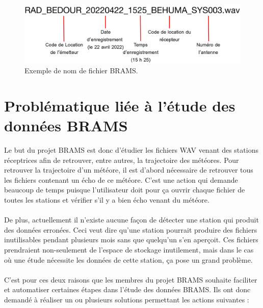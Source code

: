 \documentclass[11pt]{article}
\begin{document}
\begin{figure}[t]
    \begin{center}
        \includegraphics[scale=0.15]{file_name.png}
        \caption{Exemple de nom de fichier BRAMS.}
        \label{fig:file_name_brams}
    \end{center}
\end{figure}

\newpage

\section{Problématique liée à l'étude des données BRAMS}

Le but du projet BRAMS est donc d'étudier les fichiers WAV venant des stations réceptrices afin de retrouver, entre autres, la trajectoire des météores.
Pour retrouver la trajectoire d'un météore, il est d'abord nécessaire de retrouver tous les fichiers contenant un écho de ce météore.
C'est une action qui demande beaucoup de temps puisque l'utilisateur doit pour ça ouvrir chaque fichier de toutes les stations et vérifier s'il y a bien écho venant du météore.\\
\\
De plus, actuellement il n'existe aucune façon de détecter une station qui produit des données erronées.
Ceci veut dire qu'une station pourrait produire des fichiers inutilisables pendant plusieurs mois sans que quelqu'un s'en aperçoit.
Ces fichiers prendraient non-seulement de l'espace de stockage inutilement, mais dans le cas où une étude nécessite les données de cette station, ça pose un grand problème.\\
\\
C'est pour ces deux raisons que les membres du projet BRAMS souhaite faciliter et automatiser certaines étapes dans l'étude des données BRAMS.
Ils ont donc demandé à réaliser un ou plusieurs solutions permettant les actions suivantes :
\end{document}
